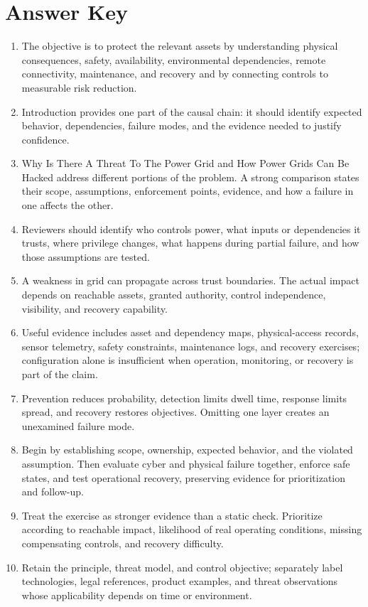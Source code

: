 \documentclass[11pt,letterpaper]{article}
\begin{document}
\section*{Answer Key}
\begin{enumerate}
\item The objective is to protect the relevant assets by understanding physical consequences, safety, availability, environmental dependencies, remote connectivity, maintenance, and recovery and by connecting controls to measurable risk reduction.
\item Introduction provides one part of the causal chain: it should identify expected behavior, dependencies, failure modes, and the evidence needed to justify confidence.
\item Why Is There A Threat To The Power Grid and How Power Grids Can Be Hacked address different portions of the problem. A strong comparison states their scope, assumptions, enforcement points, evidence, and how a failure in one affects the other.
\item Reviewers should identify who controls power, what inputs or dependencies it trusts, where privilege changes, what happens during partial failure, and how those assumptions are tested.
\item A weakness in grid can propagate across trust boundaries. The actual impact depends on reachable assets, granted authority, control independence, visibility, and recovery capability.
\item Useful evidence includes asset and dependency maps, physical-access records, sensor telemetry, safety constraints, maintenance logs, and recovery exercises; configuration alone is insufficient when operation, monitoring, or recovery is part of the claim.
\item Prevention reduces probability, detection limits dwell time, response limits spread, and recovery restores objectives. Omitting one layer creates an unexamined failure mode.
\item Begin by establishing scope, ownership, expected behavior, and the violated assumption. Then evaluate cyber and physical failure together, enforce safe states, and test operational recovery, preserving evidence for prioritization and follow-up.
\item Treat the exercise as stronger evidence than a static check. Prioritize according to reachable impact, likelihood of real operating conditions, missing compensating controls, and recovery difficulty.
\item Retain the principle, threat model, and control objective; separately label technologies, legal references, product examples, and threat observations whose applicability depends on time or environment.
\end{enumerate}
\end{document}
